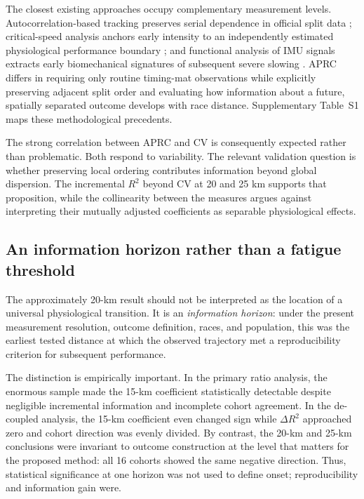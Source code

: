 \documentclass[pdflatex,sn-basic]{sn-jnl}
\begin{document}
The closest existing approaches occupy complementary measurement levels. Autocorrelation-based tracking preserves serial dependence in official split data \citep{Thuany2025}; critical-speed analysis anchors early intensity to an independently estimated physiological performance boundary \citep{SmythMuniz2020}; and functional analysis of IMU signals extracts early biomechanical signatures of subsequent severe slowing \citep{Miyazaki2025}. APRC differs in requiring only routine timing-mat observations while explicitly preserving adjacent split order and evaluating how information about a future, spatially separated outcome develops with race distance. Supplementary Table~S1 maps these methodological precedents.

The strong correlation between APRC and CV is consequently expected rather than problematic. Both respond to variability. The relevant validation question is whether preserving local ordering contributes information beyond global dispersion. The incremental $R^2$ beyond CV at 20 and 25 km supports that proposition, while the collinearity between the measures argues against interpreting their mutually adjusted coefficients as separable physiological effects.

\subsection{An information horizon rather than a fatigue threshold}
The approximately 20-km result should not be interpreted as the location of a universal physiological transition. It is an \emph{information horizon}: under the present measurement resolution, outcome definition, races, and population, this was the earliest tested distance at which the observed trajectory met a reproducibility criterion for subsequent performance.

The distinction is empirically important. In the primary ratio analysis, the enormous sample made the 15-km coefficient statistically detectable despite negligible incremental information and incomplete cohort agreement. In the de-coupled analysis, the 15-km coefficient even changed sign while $\Delta R^2$ approached zero and cohort direction was evenly divided. By contrast, the 20-km and 25-km conclusions were invariant to outcome construction at the level that matters for the proposed method: all 16 cohorts showed the same negative direction. Thus, statistical significance at one horizon was not used to define onset; reproducibility and information gain were.
\end{document}
